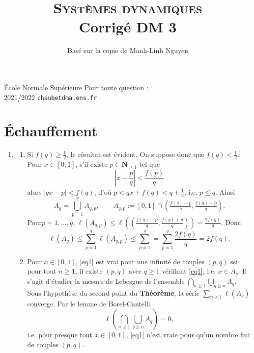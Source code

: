 \documentclass[french]{article}
\title{\textsc{Syst\`emes dynamiques} \\Corrig\'e DM 3}
\date{}
\author{\Large Bas\'e sur la copie de Manh-Linh Nguyen}
\theoremstyle{definition}
\newcommand{\tuple}[1]{\left(#1\right)}
\newcommand{\oin}[1]{\left(#1\right)}
\newcommand{\abs}[1]{\left|#1\right|}
\newcommand{\Nbb}{\mathbf{N}}
\begin{document}
{\noindent \'Ecole Normale Sup\'erieure  \hfill Pour toute question :}
\\
{2021/2022 \hfill \hfill  \texttt{chaubet\at dma.ens.fr}}

{\let\newpage\relax\maketitle}
\maketitle

	
\vspace{0.2 cm}
\section*{\'Echauffement}
\begin{enumerate}
    \item \label{Partie1}
    \begin{enumerate}
        \item Si $f(q) \ge \frac{1}{2}$, le r\'esultat est \'evident. On suppose donc que $f(q) < \frac{1}{2}$. Pour $x \in [0,1]$, s'il existe $p \in \Nbb_{\ge 1}$ tel que 
        \begin{equation} \label{eq1}
            \abs{x - \frac{p}{q}} < \frac{f(p)}{q}
        \end{equation}
    alors $|qx - p| < f(q)$, d'o\`u $p < qx + f(q) < q + \frac{1}{2}$, i.e. $p \le q$. Ainsi
        $$A_q = \bigcup_{p = 1}^q A_{q,p}, \qquad A_{q,p}:=[0,1] \cap \oin{\tfrac{f(q) - p}{q}, \tfrac{f(q) + p}{q}}.$$
    Pour$p = 1,\ldots,q$, $\ell(A_{q,p}) \le \ell\tuple{\oin{\tfrac{f(q) - p}{q}, \tfrac{f(q) + p}{q}}} = \frac{2f(q)}{q}$. Donc
        \begin{equation} \label{eq2}
            \ell(A_q) \le \sum_{p = 1}^q \ell(A_{q,p}) \le \sum_{p=1}^q  = \sum_{p=1}^q \frac{2f(q)}{q} = 2f(q).
        \end{equation}
    \item Pour $x \in [0,1]$, \eqref{eq1} est vrai pour une infinit\'e de couples $(p,q)$ ssi pour tout $n \ge 1$, il existe $(p,q)$ avec $q \ge 1$ v\'erifiant \eqref{eq1}, i.e. $x \in A_q$. Il s'agit d'\'etudier la mesure de Lebesgue de l'ensemble $\bigcap_{n \ge 1}\bigcup_{q \ge n}A_q$. Sous l'hypoth\`ese du second point du {\bf Th\'eor\`eme}, la s\'erie $\sum_{n \ge 1} \ell(A_q)$ converge. Par le lemme de Borel-Cantelli
        $$\ell\tuple{\bigcap_{n \ge 1} \bigcup_{q \ge n}A_q} = 0,$$
    i.e. pour presque tout $x \in [0,1]$, \eqref{eq1} n'est vraie pour qu'un nombre fini de couples $(p,q)$.
    \end{enumerate}
\end{enumerate}
\end{document}
